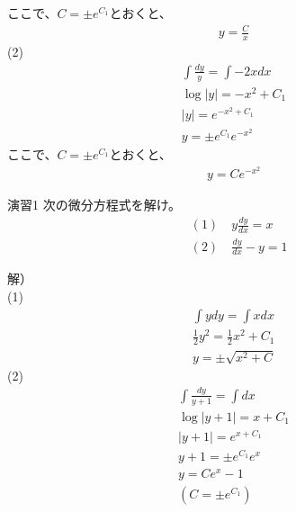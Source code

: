 \documentclass{jsarticle}
\begin{document}
ここで、$C=\pm e^{C_1} $とおくと、\\
\begin{eqnarray}
y=\frac{C}{x}
\end{eqnarray}
(2)
\begin{eqnarray}
\int \frac{dy}{y}=\int -2xdx\\
\log |y| = -x^2+C_1\\
|y|=e^{-x^2+C_1}\\
y=\pm e^{C_1}e^{-x^2}
\end{eqnarray}
ここで、$C = \pm e^{C_1}$とおくと、
\begin{eqnarray}
y=Ce^{-x^2}
\end{eqnarray}
\begin{itembox}[l]{演習1}
次の微分方程式を解け。
\begin{eqnarray}
&(1) \quad y\frac{dy}{dx}=x\\
&(2) \quad \frac{dy}{dx}-y=1
\end{eqnarray}
\end{itembox}
解）\\
(1)
\begin{eqnarray}
\int ydy=\int xdx\\
\frac{1}{2}y^2=\frac{1}{2}x^2+C_1\\
y=\pm \sqrt{x^2+C}
\end{eqnarray}
(2)
\begin{eqnarray}
\int \frac{dy}{y+1}=\int dx\\
\log|y+1|=x+C_1\\
|y+1|=e^{x+C_1}\\
y+1=\pm e^{C_1}e^x\\
y=Ce^x-1\\
(C=\pm e^{C_1})
\end{eqnarray}
\clearpage
\end{document}
